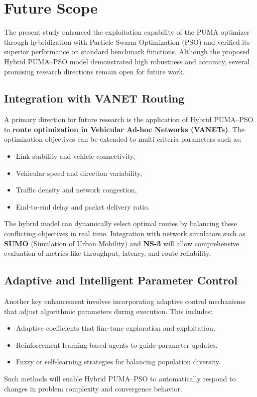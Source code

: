 \documentclass[a4paper,12pt]{article}
\begin{document}
\section{Future Scope}
\label{sec:future-scope}

The present study enhanced the exploitation capability of the PUMA optimizer 
through hybridization with Particle Swarm Optimization (PSO) and verified its 
superior performance on standard benchmark functions. 
Although the proposed Hybrid PUMA–PSO model demonstrated high robustness and accuracy, 
several promising research directions remain open for future work.

\subsection{Integration with VANET Routing}
A primary direction for future research is the application of Hybrid PUMA–PSO 
to \textbf{route optimization in Vehicular Ad-hoc Networks (VANETs)}. 
The optimization objectives can be extended to multi-criteria parameters such as:
\begin{itemize}
    \item Link stability and vehicle connectivity,
    \item Vehicular speed and direction variability,
    \item Traffic density and network congestion,
    \item End-to-end delay and packet delivery ratio.
\end{itemize}
The hybrid model can dynamically select optimal routes by balancing these conflicting 
objectives in real time. Integration with network simulators such as 
\textbf{SUMO} (Simulation of Urban Mobility) and \textbf{NS-3} will allow 
comprehensive evaluation of metrics like throughput, latency, and route reliability.

\subsection{ Adaptive and Intelligent Parameter Control}
Another key enhancement involves incorporating adaptive control mechanisms 
that adjust algorithmic parameters during execution. 
This includes:
\begin{itemize}
    \item Adaptive coefficients that fine-tune exploration and exploitation,
    \item Reinforcement learning-based agents to guide parameter updates,
    \item Fuzzy or self-learning strategies for balancing population diversity.
\end{itemize}
Such methods will enable Hybrid PUMA–PSO to automatically respond to 
changes in problem complexity and convergence behavior.
\end{document}
